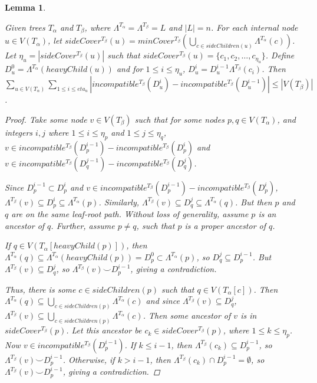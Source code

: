 \documentclass{article}
\newcommand{\compatible}{\smile}
\newcommand{\leafset}{\Lambda}
\newcommand{\TA}{T_\alpha}
\newcommand{\TB}{T_\beta}
\newtheorem{numremovednodes}[incompatibility]{Lemma}
\begin{document}
    \medskip
    \begin{numremovednodes}
        \label{lem:numremovednodes}

        Given trees $\TA$ and $\TB$, where $\leafset^{\TA} = \leafset^{\TB} = L$ and $|L| = n$. For each internal node $u \in V(\TA)$, let $sideCover^{\TB}(u) = minCover^{\TB}(\bigcup_{c \in sideChildren(u)} \leafset^{\TA}(c))$. Let $\eta_u = |sideCover^{\TB}(u)|$ such that $sideCover^{\TB}(u) = \{c_1, c_2, \dots, c_{\eta_u}\}$. Define $D_u^0 = \leafset^{\TA}(heavyChild(u))$ and for $1 \leq i \leq \eta_u$, $D_u^i = D_u^{i-1} \leafset^{\TB}(c_i)$. Then $\sum_{u \in V(\TA)} \sum_{1 \leq i \leq eta_u} |incompatible^{\TB}(D_u^i) - incompatible^{\TB}(D_u^{i-1})| \leq |V(\TB)|$.

        \begin{proof}
            Take some node $v \in V(\TB)$ such that for some nodes $p, q \in V(\TA)$, and integers $i, j$ where $1 \leq i \leq \eta_p$ and $1 \leq j \leq \eta_q$, $v \in incompatible^{\TB}(D_p^{i-1}) - incompatible^{\TB}(D_p^{i})$ and $v \in incompatible^{\TB}(D_q^{j-1}) - incompatible^{\TB}(D_q^{j})$.

            Since $D_p^{i-1} \subset D_p^i$ and $v \in incompatible^{\TB}(D_p^{i-1}) - incompatible^{\TB}(D_p^{i})$, $\leafset^{\TB}(v) \subseteq D_p^i \subseteq \leafset^{\TA}(p)$. Similarly, $\leafset^{\TB}(v) \subseteq D_q^j \subseteq \leafset^{\TA}(q)$. But then $p$ and $q$ are on the same leaf-root path. Without loss of generality, assume $p$ is an ancestor of $q$. Further, assume $p \neq q$, such that $p$ is a proper ancestor of $q$.

            If $q \in V(\TA[heavyChild(p)])$, then $\leafset^{\TA}(q) \subseteq \leafset^{\TA}(heavyChild(p)) = D_p^0 \subset \leafset^{\TA}(p)$, so $D_q^j \subseteq D_p^{i-1}$. But $\leafset^{\TB}(v) \subseteq D_q^j$, so $\leafset^{\TB}(v) \compatible D_p^{i-1}$, giving a contradiction.

            Thus, there is some $c \in sideChildren(p)$ such that $q \in V(\TA[c])$. Then $\leafset^{\TA}(q) \subseteq \bigcup_{c \in sideChildren(p)} \leafset^{\TA}(c)$ and since $\leafset^{\TB}(v) \subseteq D_q^j$, $\leafset^{\TB}(v) \subseteq \bigcup_{c \in sideChildren(p)} \leafset^{\TA}(c)$. Then some ancestor of $v$ is in $sideCover^{\TB}(p)$. Let this ancestor be $c_k \in sideCover^{\TB}(p)$, where $1 \leq k \leq \eta_{p}$. Now $v \in incompatible^{\TB}(D_p^{i-1})$. If $k \leq i - 1$, then $\leafset^{\TB}(c_k) \subseteq D_p^{i-1}$, so $\leafset^{\TB}(v) \compatible D_p^{i-1}$. Otherwise, if $k > i - 1$, then $\leafset^{\TB}(c_k) \cap D_p^{i-1} = \emptyset$, so $\leafset^{\TB}(v) \compatible D_p^{i-1}$, giving a contradiction.


\end{proof}
\end{numremovednodes}
\end{document}
